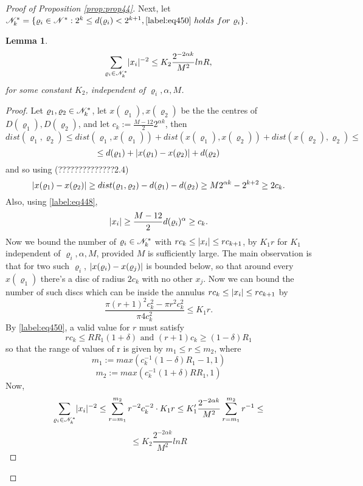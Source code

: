 \documentclass[11pt,reqno]{article}
\DeclarePairedDelimiter\abs{\lvert}{\rvert}%
\newtheorem{lemma}[thm]{Lemma}
\theoremstyle{definition}
\numberwithin{equation}{section}
\begin{document}
\begin{proof}[Proof of Proposition \eqref{prop:prop44}]
Next, let $\mathscr{N}_k^* = \{ \varrho_i \in \mathscr{N}^* : 2^k \leq d(\varrho_i) < 2^{k+1} , \eqref{label:eq450}\ holds\ for\ \varrho_i \}$.
\begin{lemma} \label{label:xi}
$$
\sum_{\varrho_i \in \ens_k^*} \abs{x_i}^{-2} \leq K_2 \frac{2^{-2\alpha k}}{M^2} lnR,
$$
for some constant $K_2$, independent of $\varrho_i, \alpha, M$.
\end{lemma}
\begin{proof}
Let $\varrho_1, \varrho_2 \in \mathscr{N}_k^*$, let $x(\varrho_1), x(\varrho_2)$ be the the centres of $D(\varrho_1), D(\varrho_2)$, and let $c_k:=\frac{M-12}{2}2^{\alpha k}$, then
$$
dist(\varrho_1, \varrho_2) \leq dist(\varrho_1, x(\varrho_1)) + dist(x(\varrho_1), x(\varrho_2)) + dist(x(\varrho_2), \varrho_2) \leq 
$$
$$
\leq d(\varrho_1) + \abs{x(\varrho_1) - x(\varrho_2)} + d(\varrho_2)
$$
and so using (??????????????2.4)
$$
\abs{x(\varrho_1) - x(\varrho_2)} \geq  dist(\varrho_1, \varrho_2) - d(\varrho_1) - d(\varrho_2) \geq M2^{\alpha k} - 2^{k+2} \geq 2c_k.
$$
Also, using \eqref{label:eq448}, 
$$
\abs{x_i} \geq \frac{M-12}{2} d(\varrho_i)^\alpha \geq c_k .
$$
Now we bound the number of $\varrho_i \in \mathscr{N}_k^*$ with $rc_k \leq \abs{x_i} \leq rc_{k+1}$, by $K_1r$ for $K_1$ independent of $\varrho_i, \alpha, M$, provided $M$ is sufficiently 
large. The main observation is that for two such $\varrho_i$, $\abs{x(\varrho_i) - x(\varrho_j)}$ is bounded below, so that around every $x(\varrho_1)$ there's a disc of radius $2c_k$ with no other $x_j$. Now we can bound the number of such discs which can be inside the annulus $rc_k \leq \abs{x_i} \leq rc_{k+1}$ by
$$
\frac{\pi(r+1)^2 c_k^2 - \pi r^2 c_k^2}{\pi 4 c_k^2} \leq K_1r.
$$
By \eqref{label:eq450}, a valid value for $r$ must satisfy
$$
rc_k \leq RR_1(1+\delta)
\text{ and }
(r+1) c_k \geq (1-\delta) R_1
$$
so that the range of values of r is given by $m_1 \leq r \leq m_2$, where
$$
m_1 := max(c_k^{-1} (1-\delta)R_1 - 1, 1)
$$
$$
m_2 := max(c_k^{-1} (1+\delta)RR_1, 1)
$$
Now,
$$
\sum_{\varrho_i \in \ens_k^*} \abs{x_i}^{-2} \leq 
\sum_{r=m_1}^{m_2} r^{-2}c_k^{-2} \cdot K_1r \leq 
K_1^\prime \frac{2^{-2\alpha k}}{M^2} \sum_{r=m_1}^{m_2} r^{-1} \leq 
$$
$$
\leq K_2 \frac{2^{-2\alpha k}}{M^2} lnR
$$
\end{proof}


\end{proof}
\end{document}
